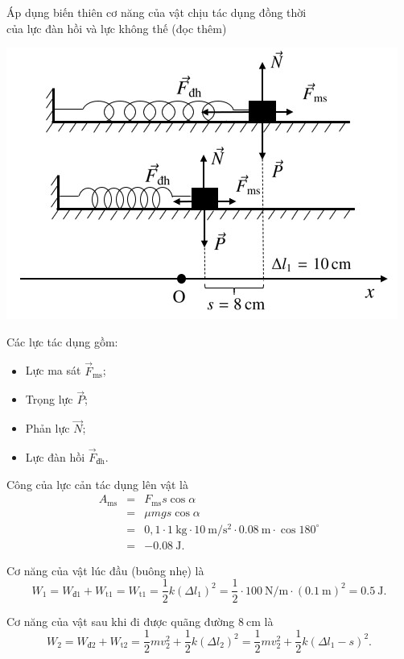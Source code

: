 \begin{dang}{Áp dụng biến thiên cơ năng của vật chịu tác dụng đồng thời \\của lực đàn hồi và lực không thế (đọc thêm)}
{		\begin{center}
			\includegraphics[scale=0.6]{../figs/VN10-PH-33-L-025-6-H2.jpg}
		\end{center}
		
		Các lực tác dụng gồm:
		\begin{itemize}
			\item Lực ma sát $\vec{F}_\text{ms}$;
			\item Trọng lực $\vec{P}$;
			\item Phản lực $\vec{N}$;
			\item Lực đàn hồi $\vec{F}_\text{đh}$.
		\end{itemize}
		
		Công của lực cản tác dụng lên vật là
		\begin{eqnarray*}
			A_\text{ms}&=&F_\text{ms}s\cos\alpha\\
			&=&\mu mg s \cos\alpha\\
			&=& 0,1\cdot\SI{1}{\kilogram}\cdot\SI{10}{\meter/\second^2}\cdot\SI{0,08}{\meter}\cdot\cos 180^\circ\\
			&=&\SI{-0,08}{\joule}.
		\end{eqnarray*}
		
		Cơ năng của vật lúc đầu (buông nhẹ) là
		\begin{equation*}
			W_1=W_\text{đ1}+W_\text{t1}=W_\text{t1}=\dfrac{1}{2}k(\Delta l_1)^2=\dfrac{1}{2}\cdot\SI{100}{\newton/\meter}\cdot(\SI{0,1}{\meter})^2=\SI{0,5}{\joule}.
		\end{equation*}
		
		Cơ năng của vật sau khi đi được quãng đường $\SI{8}{\centi\meter}$ là
		\begin{equation*}
			W_2=W_\text{đ2}+W_\text{t2}=\dfrac{1}{2}mv_2^2+\dfrac{1}{2}k(\Delta l_2)^2=\dfrac{1}{2}mv_2^2+\dfrac{1}{2}k(\Delta l_1 - s)^2.
		\end{equation*}
		
}
\end{dang}
